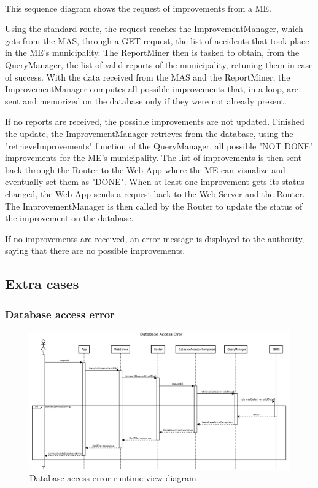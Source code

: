 					\paragraph{}
						This sequence diagram shows the request of improvements from a ME. 
						
						Using the standard route, the request reaches the ImprovementManager, which gets from the MAS, through a GET request, the list of accidents that took place in the ME's municipality. The ReportMiner then is tasked to obtain, from the QueryManager, the list of valid reports of the municipality, retuning them in case of success. With the data received from the MAS and the ReportMiner, the ImprovementManager computes all possible improvements that, in a loop, are sent and memorized on the database only if they were not already present.
						
						If no reports are received, the possible improvements are not updated.  Finished the update, the ImprovementManager retrieves from the database, using the "retrieveImprovements" function of the QueryManager, all possible "NOT DONE" improvements for the ME's municipality. The list of improvements is then sent back through the Router to the Web App where the ME can visualize and eventually set them as "DONE". When at least one improvement gets its status changed, the Web App sends a request back to the Web Server and the Router. The ImprovementManager is then called by the Router to update the status of the improvement on the database.
						
						If no improvements are received, an error message is displayed to the authority, saying that there are no possible improvements.
			\subsection{Extra cases}
				\subsubsection{Database access error}
					\begin{figure}[!h]
						\centering
						\includegraphics[width=\textwidth]{images/DD2/RuntimeView/Error/dbAccessError.pdf}
						\caption{Database access error runtime view diagram}
					\end{figure}
